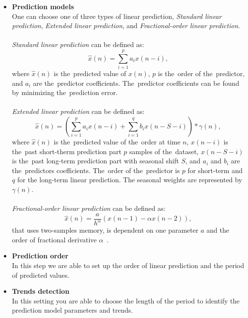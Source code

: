\newpage
        \begin{itemize}
            \item \textbf{Prediction models}\\
            One can choose one of three types of linear prediction, \emph{Standard linear prediction}, \emph{Extended linear prediction},
            and \emph{Fractional-order linear prediction}.\\
      \\
     \emph{Standard linear prediction} can be defined as:
                 \begin{equation}\label{eg:lp}
                \hat{x}(n) = \sum_{i=1}^{p} a_i x(n-i),
                \label{eq:linear-predictor}
            \end{equation}
            where $\hat{x}(n)$ is the~predicted value of $x(n)$, $p$ is the~order of the~predictor, and $a_i$ are the~predictor coefficients. The~predictor coefficients can be found by minimizing the~prediction error.
                        \\
                        \\
   \emph{Extended linear prediction} can be defined as:
%
                 \begin{equation}\label{eg:elp}
                \hat{x}(n) = \left(\sum_{i=1}^{p} a_i x(n-i) + \sum_{i=1}^{q} b_i x(n-S-i)\right) * \gamma(n),
            \end{equation}
            where $\hat{x}(n)$ is the~predicted value of the~order at time $n$, $x(n-i)$ is the~past short-therm prediction part $p$ samples of the~dataset, $x(n-S-i)$ is the~past long-term prediction part with seasonal shift $S$, and $a_i$ and $b_i$ are the~predictors coefficients. The~order of the~predictor is $p$ for short-term and $q$ for the long-term linear prediction. The seasonal weights are represented by $\gamma(n)$.\\
                                    \\
    \emph{Fractional-order linear prediction} can be defined as:
            \\
            \begin{equation}\label{eg:flp}
                \hat{x}(n) = \frac{a}{h^\alpha}(x(n-1) - \alpha x(n-2)),
                \label{eq:linear-predictor}
            \end{equation}
            that uses two-samples memory, is dependent on one parameter $a$ and the order of fractional derivative $\alpha$~\cite{skovranek}.
           
            \item \textbf{Prediction order}\\
            In this step we are able to set up the order of linear prediction and the
            period of predicted values.
            \item \textbf{Trends detection}\\
            In this setting you are able to choose the length of the period to 
            identify the prediction model parameters and trends.
        \end{itemize}

